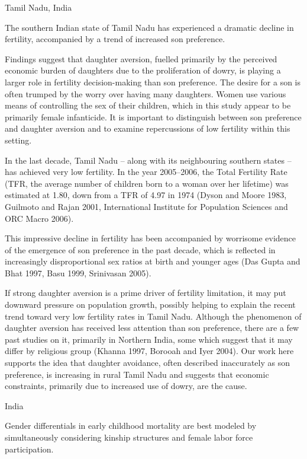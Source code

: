 \citep{DiamondSmith2008}

Tamil Nadu, India

The southern Indian state of Tamil Nadu has experienced a dramatic
decline in fertility, accompanied by a trend of increased son
preference.

Findings suggest that daughter aversion, fuelled primarily by the
perceived economic burden of daughters due to the proliferation of
dowry, is playing a larger role in fertility decision-making than son
preference. The desire for a son is often trumped by the worry over
having many daughters. Women use various means of controlling the sex of
their children, which in this study appear to be primarily female
infanticide. It is important to distinguish between son preference and
daughter aversion and to examine repercussions of low fertility within
this setting.

In the last decade, Tamil Nadu – along with its neighbouring southern
states – has achieved very low fertility. In the year 2005–2006, the
Total Fertility Rate (TFR, the average number of children born to a
woman over her lifetime) was estimated at 1.80, down from a TFR of 4.97
in 1974 (Dyson and Moore 1983, Guilmoto and Rajan 2001, International
Institute for Population Sciences and ORC Macro 2006).

This impressive decline in fertility has been accompanied by worrisome
evidence of the emergence of son preference in the past decade, which is
reflected in increasingly disproportional sex ratios at birth and
younger ages (Das Gupta and Bhat 1997, Basu 1999, Srinivasan 2005).

If strong daughter aversion is a prime driver of fertility limitation,
it may put downward pressure on population growth, possibly helping to
explain the recent trend toward very low fertility rates in Tamil Nadu.
Although the phenomenon of daughter aversion has received less attention
than son preference, there are a few past studies on it, primarily in
Northern India, some which suggest that it may differ by religious group
(Khanna 1997, Borooah and Iyer 2004). Our work here supports the idea
that daughter avoidance, often described inaccurately as son preference,
is increasing in rural Tamil Nadu and suggests that economic
constraints, primarily due to increased use of dowry, are the cause.

\citep{Kishor1993}

India

Gender differentials in early childhood
mortality are best modeled by simultaneously
considering kinship structures and female labor force participation.

